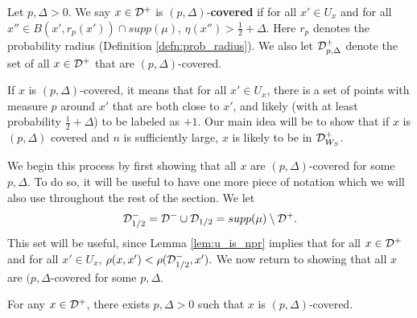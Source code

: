 \begin{defn}\label{defn:covered}
Let $p, \Delta > 0.$ We say $x \in {\mathcal D}^+$ is $(p, \Delta)$-\textbf{covered} if for all $x' \in U_x$ and for all $x'' \in B(x', r_p(x')) \cap supp(\mu)$, $\eta(x'') > \frac{1}{2} + \Delta.$ Here $r_p$ denotes the probability radius (Definition \ref{defn:prob_radius}). We also let ${\mathcal D}_{p, \Delta}^+$ denote the set of all $x \in {\mathcal D}^+$ that are $(p, \Delta)$-covered. 
\end{defn}

If $x$ is $(p, \Delta)$-covered, it means that for all $x' \in U_x$, there is a set of points with measure $p$ around $x'$ that are both close to $x'$, and likely (with at least probability $\frac{1}{2} + \Delta$) to be labeled as $+1$. Our main idea will be to show that if $x$ is $(p, \Delta)$ covered and $n$ is sufficiently large, $x$ is likely to be in ${\mathcal D}_{W_S}^+$. 

We begin this process by first showing that all $x$ are $(p, \Delta)$-covered for some $p, \Delta$. To do so, it will be useful to have one more piece of notation which we will also use throughout the rest of the section. We let $${\mathcal D}_{1/2}^{-} = {\mathcal D}^- \cup {\mathcal D}_{1/2} = supp(\mu) \setminus {\mathcal D}^+.$$ This set will be useful, since Lemma \ref{lem:u_is_npr} implies that for all $x \in {\mathcal D}^+$ and for all $x' \in U_x$, $\rho(x, x') < \rho({\mathcal D}_{1/2}^{-}, x').$ We now return to showing that all $x$ are $(p, \Delta$-covered for some $p, \Delta$.

\begin{lem}\label{lem:everything_covered}
For any $x \in {\mathcal D}^+$, there exists $p, \Delta > 0$ such that $x$ is $(p, \Delta)$-covered.
\end{lem}

